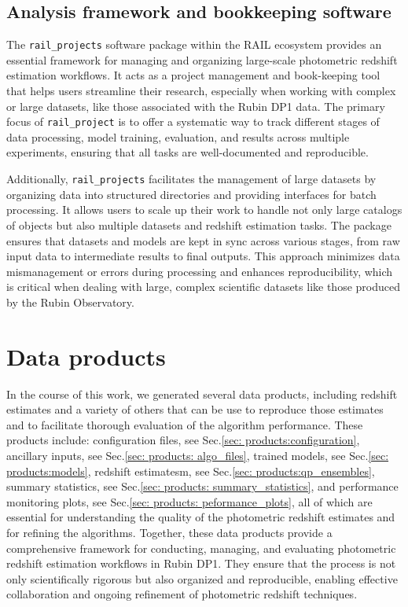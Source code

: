 \subsection{Analysis framework and bookkeeping software}
\label{sec:method:rail_project}


The \texttt{rail\_projects} software package within the RAIL ecosystem provides an essential framework for managing and organizing large-scale photometric redshift estimation workflows.  It acts as a project management and book-keeping tool that helps users streamline their research, especially when working with complex or large datasets, like those associated with the Rubin DP1 data.  The primary focus of \texttt{rail\_project} is to offer a systematic way to track different stages of data processing, model training, evaluation, and results across multiple experiments, ensuring that all tasks are well-documented and reproducible.

Additionally, \texttt{rail\_projects} facilitates the management of large datasets by organizing data into structured directories and providing interfaces for batch processing.  It allows users to scale up their work to handle not only large catalogs of objects but also multiple datasets and redshift estimation tasks.  The package ensures that datasets and models are kept in sync across various stages, from raw input data to intermediate results to final outputs.  This approach minimizes data mismanagement or errors during processing and enhances reproducibility, which is critical when dealing with large, complex scientific datasets like those produced by the Rubin Observatory.


\section{Data products}
\label{sec:products:0}

In the course of this work, we generated several data products, including redshift estimates and a variety of others that can be use to reproduce those estimates and to facilitate thorough evaluation of the algorithm performance.  These products include: configuration files, see Sec.\ref{sec: products:configuration}, ancillary inputs, see Sec.\ref{sec: products: algo_files}, trained models, see Sec.\ref{sec: products:models}, redshift estimatesm, see Sec.\ref{sec: products:qp_ensembles}, summary statistics,  see Sec.\ref{sec: products: summary_statistics}, and performance monitoring plots, see Sec.\ref{sec: products: peformance_plots}, all of which are essential for understanding the quality of the photometric redshift estimates and for refining the algorithms.   Together, these data products provide a comprehensive framework for conducting, managing, and evaluating photometric redshift estimation workflows in Rubin DP1.  They ensure that the process is not only scientifically rigorous but also organized and reproducible, enabling effective collaboration and ongoing refinement of photometric redshift techniques.


